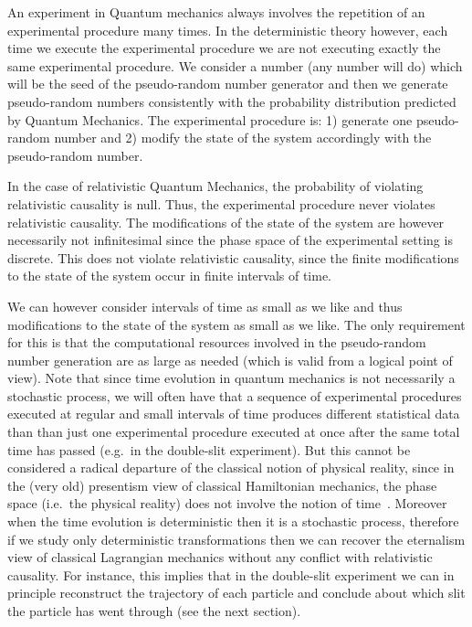 \documentclass[11pt]{book}
\begin{document}
An experiment in Quantum mechanics always involves the repetition of an
experimental procedure many times. In the deterministic theory however,
each time we execute the experimental procedure we are not executing
exactly the same experimental procedure. We consider a number (any
number will do) which will be the seed of the pseudo-random number
generator and then we generate pseudo-random numbers consistently with
the probability distribution predicted by Quantum Mechanics. The
experimental procedure is: 1) generate one pseudo-random number and 2)
modify the state of the system accordingly with the pseudo-random
number.

In the case of relativistic Quantum Mechanics, the probability of
violating relativistic causality is null. Thus, the experimental
procedure never violates relativistic causality. The modifications of
the state of the system are however necessarily not infinitesimal since
the phase space of the experimental setting is discrete. This does not
violate relativistic causality, since the finite modifications to the
state of the system occur in finite intervals of time.

We can however consider intervals of time as small as we like and thus
modifications to the state of the system as small as we like. The only
requirement for this is that the computational resources involved in the
pseudo-random number generation are as large as needed (which is valid
from a logical point of view). Note that since time evolution in quantum
mechanics is not necessarily a stochastic process, we will often have
that a sequence of experimental procedures executed at regular and small
intervals of time produces different statistical data than than just one
experimental procedure executed at once after the same total time has
passed (e.g.~in the double-slit experiment). But this cannot be
considered a radical departure of the classical notion of physical
reality, since in the (very old) presentism view of classical
Hamiltonian mechanics, the phase space (i.e.~the physical reality) does
not involve the notion of
time~\cite{Savitt2017Being}. Moreover
when the time evolution is deterministic then it is a stochastic
process, therefore if we study only deterministic transformations then
we can recover the eternalism view of classical Lagrangian mechanics
without any conflict with relativistic causality. For instance, this
implies that in the double-slit experiment we can in principle
reconstruct the trajectory of each particle and conclude about which
slit the particle has went through (see the next section).
\end{document}
